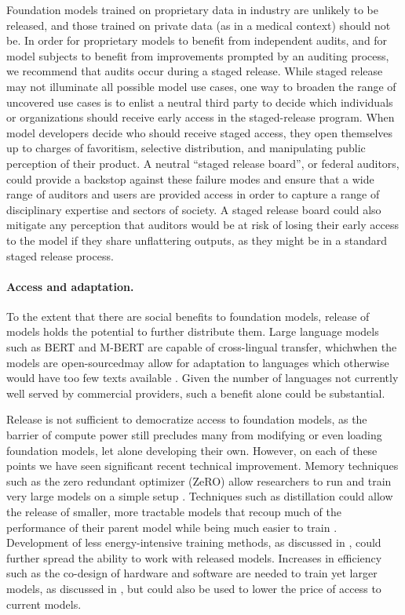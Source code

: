 Foundation models trained on proprietary data in industry are unlikely to be released, and those trained on private data (as in a medical context) should not be. In order for proprietary models to benefit from independent audits, and for model subjects to benefit from improvements prompted by an auditing process, we recommend that audits occur during a staged release.  While staged release may not illuminate all possible model use cases, one way to broaden the range of uncovered use cases is to enlist a neutral third party to decide which individuals or organizations should receive early access in the staged-release program.
When model developers decide who should receive staged access, they open themselves up to charges of favoritism, selective distribution, and manipulating public perception of their product. 
A neutral “staged release board”, or federal auditors, could provide a backstop against these failure modes and ensure that a wide range of auditors and users are provided access in order to capture a range of disciplinary expertise and sectors of society. 
A staged release board could also mitigate any perception that auditors would be at risk of losing their early access to the model if they share unflattering outputs, as they might be in a standard staged release process. 

\paragraph{Access and adaptation.} 

To the extent that there are social benefits to foundation models, release of models holds the potential to further distribute them. Large language models such as BERT and M-BERT are capable of cross-lingual transfer, which\dash{}when the models are open-sourced\dash{}may allow for adaptation to languages which otherwise would have too few texts available \citep{wu-dredze-2019-beto, wang_extending_2020}. 
Given the number of languages not currently well served by commercial providers, such a benefit alone could be substantial.   

Release is not sufficient to democratize access to foundation models, as the barrier of compute power still precludes many from modifying or even loading foundation models, let alone developing their own. 
However, on each of these points we have seen significant recent technical  improvement. 
Memory techniques such as the zero redundant optimizer (ZeRO) allow researchers to run and train very large models on a simple setup \citep{rasley2020deepspeed, rajbhandari2021zeroinfinity}.
Techniques such as distillation could allow the release of smaller, more tractable models that recoup much of the performance of their parent model while being much easier to train \citep{li2020train}. 
Development of less energy-intensive training methods, as discussed in , could further spread the ability to work with released models. 
Increases in efficiency such as the co-design of hardware and software are needed to train yet larger models, as discussed in , but could also be used to lower the price of access to current models.  
 
